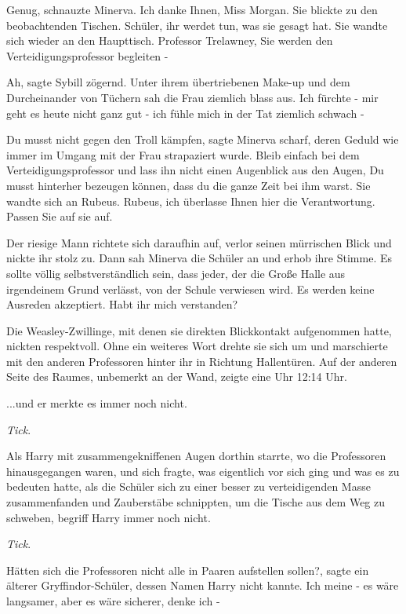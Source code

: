 \glqq{}Genug\grqq{}, schnauzte Minerva. \glqq{}Ich danke Ihnen, Miss
Morgan.\grqq{} Sie blickte zu den beobachtenden Tischen. \glqq{}Schüler, ihr
werdet tun, was sie gesagt hat.\grqq{} Sie wandte sich wieder an den Haupttisch.
\glqq{}Professor Trelawney, Sie werden den Verteidigungsprofessor begleiten
-\grqq{}

\glqq{}Ah\grqq{}, sagte Sybill zögernd. Unter ihrem übertriebenen Make-up und dem
Durcheinander von Tüchern sah die Frau ziemlich blass aus. \glqq{}Ich fürchte -
mir geht es heute nicht ganz gut - ich fühle mich in der Tat ziemlich schwach
-\grqq{}

\glqq{}Du musst nicht gegen den Troll kämpfen\grqq{}, sagte Minerva scharf, deren
Geduld wie immer im Umgang mit der Frau strapaziert wurde. \glqq{}Bleib einfach
bei dem Verteidigungsprofessor und lass ihn nicht einen Augenblick aus den
Augen, Du musst hinterher bezeugen können, dass du die ganze Zeit bei ihm
warst.\grqq{} Sie wandte sich an Rubeus. \glqq{}Rubeus, ich überlasse Ihnen hier
die Verantwortung. Passen Sie auf sie auf.\grqq{}

Der riesige Mann richtete sich daraufhin auf, verlor seinen mürrischen Blick und
nickte ihr stolz zu. Dann sah Minerva die Schüler an und erhob ihre Stimme.
\glqq{}Es sollte völlig selbstverständlich sein, dass jeder, der die Große Halle
aus irgendeinem Grund verlässt, von der Schule verwiesen wird. Es werden keine
Ausreden akzeptiert. Habt ihr mich verstanden?\grqq{}

Die Weasley-Zwillinge, mit denen sie direkten Blickkontakt aufgenommen hatte,
nickten respektvoll. Ohne ein weiteres Wort drehte sie sich um und marschierte
mit den anderen Professoren hinter ihr in Richtung Hallentüren. Auf der anderen
Seite des Raumes, unbemerkt an der Wand, zeigte eine Uhr 12:14 Uhr.

...und er merkte es immer noch nicht.

\emph{Tick}.

Als Harry mit zusammengekniffenen Augen dorthin starrte, wo die Professoren
hinausgegangen waren, und sich fragte, was eigentlich vor sich ging und was es
zu bedeuten hatte, als die Schüler sich zu einer besser zu verteidigenden Masse
zusammenfanden und Zauberstäbe schnippten, um die Tische aus dem Weg zu
schweben, begriff Harry immer noch nicht.

\emph{Tick}.

\glqq{}Hätten sich die Professoren nicht alle in Paaren aufstellen
sollen?\grqq{}, sagte ein älterer Gryffindor-Schüler, dessen Namen Harry nicht
kannte. \glqq{}Ich meine - es wäre langsamer, aber es wäre sicherer, denke ich
-\grqq{}

